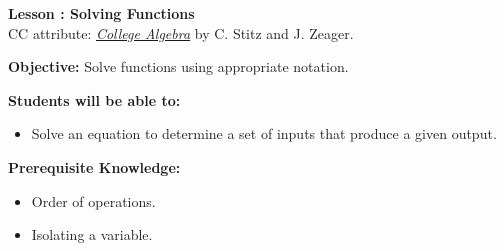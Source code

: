 \documentclass[12pt]{article}
\theoremstyle{definition}
\begin{document}
{\bf \large Lesson : Solving Functions}\label{les:solving_functions}
\\ CC attribute: \href{http://www.stitz-zeager.com}{\it{College Algebra}} by C. Stitz and J. Zeager. 
\hfill \doclicenseImage[imagewidth=5em]\\
\par
{\bf Objective:} Solve functions using appropriate notation.\\
\par
{\bf Students will be able to:}
\begin{itemize}
	\item Solve an equation to determine a set of inputs that produce a given output.
\end{itemize}
{\bf Prerequisite Knowledge:}
\begin{itemize}
	\item Order of operations.
	\item Isolating a variable.
\end{itemize}
\hrulefill
\end{document}
